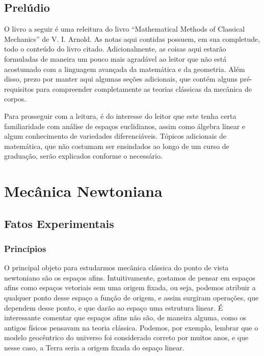 \documentclass[a4paper,12pt]{book}
\begin{document}
\clearpage
\thispagestyle{empty}

\clearpage
\tableofcontents
\thispagestyle{empty}
\clearpage
\begingroup
  \pagestyle{empty}%
  \cleardoublepage
\endgroup

\setcounter{page}{1}

\setcounter{chapter}{-1}

\chapter{Prelúdio}

O livro a seguir é uma releitura do livro ``Mathematical Methods of Classical Mechanics'' de V. I. Arnold. As notas aqui contidas possuem, em sua completude, todo o conteúdo do livro citado. Adicionalmente, as coisas aqui estarão formuladas de maneira um pouco mais agradável ao leitor que não está acostumado com a linguagem avançada da matemática e da geometria. Além disso, prezo por manter aqui algumas seções adicionais, que contém alguns pré-requisitos para compreender completamente as teorias clássicas da mecânica de corpos.

Para prosseguir com a leitura, é do interesse do leitor que este tenha certa familiaridade com análise de espaços euclidianos, assim como álgebra linear e algum conhecimento de variedades diferenciáveis. Tópicos adicionais de matemática, que não costumam ser ensindados ao longo de um curso de graduação, serão explicados conforme o necessário.

\part{Mecânica Newtoniana}

\chapter{Fatos Experimentais}

\section{Princípios}

O principal objeto para estudarmos mecânica clássica do ponto de vista newtoniano são os espaços afins. Intuitivamente, gostamos de pensar em espaços afins como espaços vetoriais sem uma origem fixada, ou seja, podemos atribuir a qualquer ponto desse espaço a função de origem, e assim surgiram operações, que dependem desse ponto, e que darão ao espaço uma estrutura linear. É interessante comentar que espaços afins não são, de maneira alguma, como os antigos físicos pensavam na teoria clássica. Podemos, por exemplo, lembrar que o modelo geocêntrico do universo foi considerado correto por muitos anos, e que nesse caso, a Terra seria a origem fixada do espaço linear.
\end{document}
